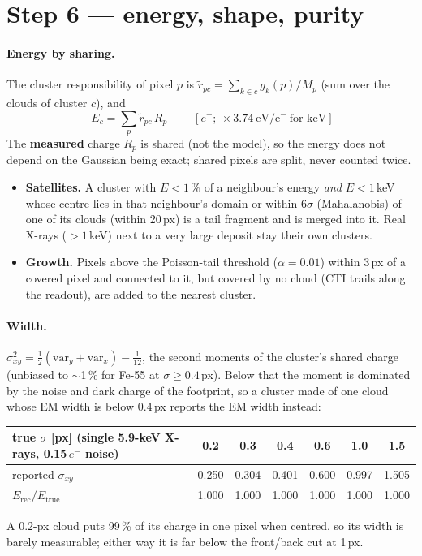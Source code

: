 \documentclass[11pt,a4paper]{article}
\newcommand{\el}{\ensuremath{e^-}}
\begin{document}
\section{Step 6 --- energy, shape, purity}\label{sec:energy}

\paragraph{Energy by sharing.} The cluster responsibility of pixel $p$ is $\tilde r_{pc}=\sum_{k\in c}g_k(p)/M_p$ (sum over the
clouds of cluster $c$), and
\begin{equation}
\boxed{\;E_c=\sum_p\tilde r_{pc}\,R_p\;}\qquad[\el;\ \times3.74\ \mathrm{eV/\el}\ \text{for keV}]
\end{equation}
The \textbf{measured} charge $R_p$ is shared (not the model), so the energy does not depend on the Gaussian being exact; shared
pixels are split, never counted twice.
\begin{itemize}
\item \textbf{Satellites.} A cluster with $E<1\,\%$ of a neighbour's energy \emph{and} $E<1$\,keV whose centre lies in that
neighbour's domain or within $6\sigma$ (Mahalanobis) of one of its clouds (within 20\,px) is a tail fragment and is merged into
it. Real X-rays ($>1$\,keV) next to a very large deposit stay their own clusters.
\item \textbf{Growth.} Pixels above the Poisson-tail threshold ($\alpha=0.01$) within 3\,px of a covered pixel and connected to it,
but covered by no cloud (CTI trails along the readout), are added to the nearest cluster.
\end{itemize}

\paragraph{Width.} $\sigma_{xy}^2=\tfrac12(\mathrm{var}_y+\mathrm{var}_x)-\tfrac1{12}$, the second moments of the cluster's shared
charge (unbiased to $\sim$1\,\% for Fe-55 at $\sigma\ge0.4$\,px). Below that the moment is dominated by the noise and dark charge
of the footprint, so a cluster made of one cloud whose EM width is below 0.4\,px reports the EM width instead:

\begin{table}[H]\centering\footnotesize
\begin{tabular}{lcccccc}
\toprule
true $\sigma$ [px] (single 5.9-keV X-rays, 0.15\,\el{} noise) & 0.2 & 0.3 & 0.4 & 0.6 & 1.0 & 1.5 \\
\midrule
reported $\sigma_{xy}$ & 0.250 & 0.304 & 0.401 & 0.600 & 0.997 & 1.505 \\
$E_\mathrm{rec}/E_\mathrm{true}$ & 1.000 & 1.000 & 1.000 & 1.000 & 1.000 & 1.000 \\
\bottomrule
\end{tabular}
\end{table}
\noindent A 0.2-px cloud puts 99\,\% of its charge in one pixel when centred, so its width is barely measurable; either way it
is far below the front/back cut at 1\,px.
\end{document}
